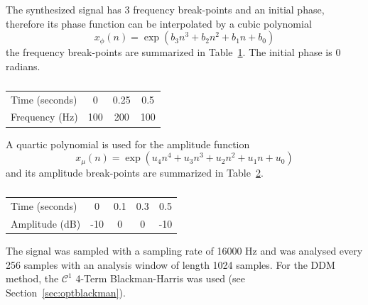 \documentclass[letterpaper,12pt]{report}
\begin{document}
The synthesized signal has 3 frequency break-points and an initial phase,
therefore its phase function can be interpolated by a cubic polynomial
\[
    x_{\phi}(n) = \exp \left(b_3 n^{3} + b_2 n^{2} + b_1 n + b_0 \right)
\]
the frequency break-points are summarized in Table~\ref{tab:cubicsinphparams}. The
initial phase is $0$ radians.

\begin{table}
    \caption{\label{tab:cubicsinphparams}}
    \begin{center}
        \begin{tabular}{l|c c c}
            Time (seconds) & 0 & 0.25 & 0.5 \\
            Frequency (Hz) & 100 & 200 & 100
        \end{tabular}
    \end{center}
\end{table}

A quartic polynomial is used for the amplitude function
\[
    x_{\mu}(n) = \exp \left(u_4 n^{4} + u_3 n^{3} + u_2 n^{2} + u_1 n + u_0 \right)
\]
and its amplitude break-points are summarized in
Table~\ref{tab:quarticsinampparams}.

\begin{table}
    \caption{\label{tab:quarticsinampparams}}
    \begin{center}
        \begin{tabular}{l|c c c c}
            Time (seconds) & 0 & 0.1 & 0.3 & 0.5 \\
            Amplitude (dB) & -10 & 0 & 0 & -10
        \end{tabular}
    \end{center}
\end{table}

The signal was sampled with a sampling rate of 16000 Hz and was analysed every
256 samples with an analysis window of length 1024 samples. For the DDM method, the
$\mathcal{C}^{1}$ 4-Term Blackman-Harris was used (see
Section~\ref{sec:optblackman}).
\end{document}
